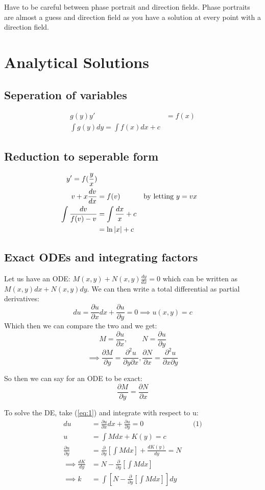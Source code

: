 \documentclass{article}
\newcommand{\di}{\frac{dy}{dx}}
\newcommand{\pd}[2]{\frac{\partial#1}{\partial#2}}
\begin{document}
Have to be careful between phase portrait and direction fields. Phase portraits are almost a guess and direction field as you have a solution at every point with a direction field.

\section{Analytical Solutions}

\subsection{Seperation of variables}

\begin{align*}
  g(y)y' &= f(x)\\
  \int g(y)dy = \int f(x)dx + c
\end{align*}

\subsection{Reduction to seperable form}

\begin{align*}
  y' = f(\frac{y}{x})\\
  v + x \frac{dv}{dx} &= f(v) && \text{by letting $ y = vx$}\\
  \int \frac{dv}{f(v) - v} &= \int \frac{dx}{x} + c\\
  &= \ln |x| + c\\
\end{align*}

\subsection{Exact ODEs and integrating factors}

Let us have an ODE: $M(x, y) + N(x, y)\di = 0$ which can be written as $M(x, y)dx + N(x, y)dy$. We can then write a total differential as partial derivatives:
\begin{equation}  \label{eq:1}
  du = \pd{u}{x} dx + \pd{u}{y} = 0 \implies u(x, y) = c
\end{equation}
Which then we can compare the two and we get:
$$ M = \pd{u}{x}, \qquad N = \pd{u}{y} $$ $$\implies \pd{M}{y} = \frac{\partial^2u}{\partial y \partial x}, \pd{N}{x} = \frac{\partial^2u}{\partial x \partial y} $$

So then we can say for an ODE to be exact:
$$ \pd{M}{y} = \pd{N}{x} $$

To solve the DE, take (\ref{eq:1}) and integrate with respect to u:
\begin{align*}
  du &= \pd{u}{x} dx + \pd{u}{y} = 0 && \text{(1)}\\
  u &= \int M dx + K(y)= c \\
  \pd{u}{y} &= \pd{}{y}\left[\int M dx\right] + \frac{dK(y)}{dy} = N \\
  \implies \frac{dK}{dy} &= N - \pd{}{y}\left[ \int Mdx \right] \\
  \implies k &= \int \left[ N - \pd{}{y}\left[ \int M dx \right]\right]dy \\
\end{align*}
\end{document}
